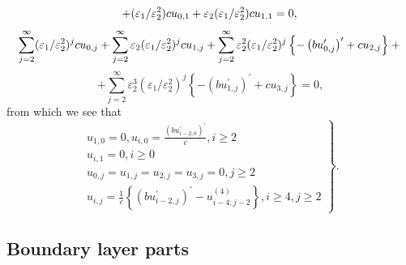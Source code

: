 \documentclass[12pt]{article}
\begin{document}
\begin{equation*}
+(\varepsilon _{1}/\varepsilon _{2}^{2})cu_{0,1}+\varepsilon _{2}(\varepsilon _{1}/\varepsilon _{2}^{2})cu_{1,1}=0, \\
\end{equation*}%
\begin{equation*}
\sum_{j=2}^{\infty }(\varepsilon
_{1}/\varepsilon _{2}^{2})^{j}cu_{0,j}+\sum_{j=2}^{\infty }\varepsilon
_{2}(\varepsilon _{1}/\varepsilon _{2}^{2})^{j}cu_{1,j}+\sum_{j=2}^{\infty }\varepsilon _{2}^{2}(\varepsilon _{1}/\varepsilon
_{2}^{2})^{j}\left\{ -\left( bu_{0,j}^{\prime }\right) ^{\prime }+cu_{2,j}\right\} +\\
\end{equation*}%
\begin{equation*}
+\sum_{j=2}^{\infty
}\varepsilon _{2}^{3}(\varepsilon _{1}/\varepsilon _{2}^{2})^{j}\left\{ -\left(
bu_{1,j}^{\prime }\right) ^{\prime }+cu_{3,j}\right\} =0,
\end{equation*}%
from which we see that%
\begin{equation*}
\left. 
\begin{array}{c}
u_{1,0}=0,u_{i,0}=\frac{\left( bu_{i-2,0}^{\prime }\right) ^{\prime }}{c}%
,i\geq 2 \\  
u_{i,1}=0,i\geq 0 \\
u_{0,j}=u_{1,j}=u_{2,j}=u_{3,j}=0,j\geq 2 \\
u_{i,j}=\frac{1}{c}\left\{ \left( bu_{i-2,j}^{\prime }\right) ^{\prime
}-u_{i-4,j-2}^{(4)}\right\} ,i\geq 4,j\geq 2%
\end{array}%
\right\} .
\end{equation*}

\subsection{Boundary layer parts}
\end{document}

